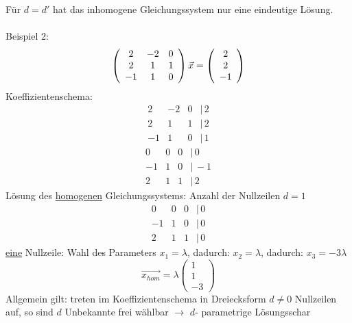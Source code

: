 \documentclass{article}
\begin{document}
Für $d=d'$ hat das inhomogene Gleichungssystem nur eine eindeutige Lösung.\\\\
Beispiel 2:
\begin{equation*}
    \left(\begin{array}{c c c}2&-2&0\\2&1&1\\-1&1&0\end{array}\right) \vec{x} = \left(\begin{array}{c}2\\2\\-1\end{array}\right)
\end{equation*}
Koeffizientenschema:
\begin{equation*}
    \begin{matrix}
        2&-2&0&|\,2\\
        2&1&1&|\,2\\
        -1&1&0&|\,1
    \end{matrix}
\end{equation*}
\begin{equation*}
    \begin{matrix}
        0&0&0&|\,0\\
        -1&1&0&|\,-1\\
        2&1&1&|\,2
    \end{matrix}
\end{equation*}
Lösung des \underline{homogenen} Gleichungssystems: Anzahl der Nullzeilen $d=1$
\begin{equation*}
    \begin{matrix}
        0&0&0&|\,0\\
        -1&1&0&|\,0\\
        2&1&1&|\,0
    \end{matrix}
\end{equation*}
\underline{eine} Nullzeile: Wahl des Parameters $x_1 = \lambda$, dadurch: $x_2 = \lambda$, dadurch: $x_3 = -3 \lambda$
\begin{equation*}
    \vec{x_{hom}} = \lambda \left(\begin{array}{c}
        1\\1\\-3
    \end{array}\right)
\end{equation*}
Allgemein gilt: treten im Koeffizientenschema in Dreiecksform $d\neq 0$ Nullzeilen auf, so sind $d$ Unbekannte frei wählbar $\rightarrow$ $d$- parametrige Lösungsschar\\
\end{document}
